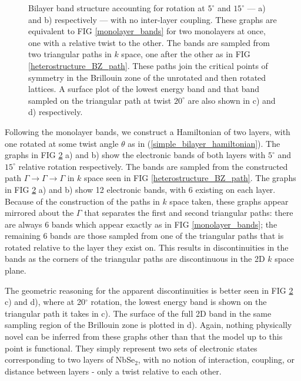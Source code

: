 \documentclass[12pt]{report} %
\begin{document}
\begin{figure}[t!]
\begin{subfigure}[t]{0.475\textwidth}
    \caption{
    }
    \label{surface_plot}
  \end{subfigure}
  \caption{
    Bilayer band structure accounting for rotation at $5^\circ$ and $15^\circ$ — a) and b) respectively — with no inter-layer coupling. These graphs are equivalent to FIG \ref{monolayer_bands} for two monolayers at once, one with a relative twist to the other. The bands are sampled from two triangular paths in $k$ space, one after the other as in FIG \ref{heterostructure_BZ_path}. These paths join the critical points of symmetry in the Brillouin zone of the unrotated and then rotated lattices. A surface plot of the lowest energy band and that band sampled on the triangular path at twist $20^\circ$ are also shown in c) and d) respectively.
  }
  \label{bilayer_bands}
\end{figure}

Following the monolayer bands, we construct a Hamiltonian of two layers, with one rotated at some twist angle $\theta$ as in (\ref{simple_bilayer_hamiltonian}). The graphs in FIG \ref{bilayer_bands} a) and b) show the electronic bands of both layers with $5^\circ$ and $15^\circ$ relative rotation respectively. The bands are sampled from the constructed path $\Gamma \rightarrow \Gamma \rightarrow \Gamma$ in $k$ space seen in FIG \ref{heterostructure_BZ_path}. The graphs in FIG \ref{bilayer_bands} a) and b) show 12 electronic bands, with 6 existing on each layer. Because of the construction of the paths in $k$ space taken, these graphs appear mirrored about the $\Gamma$ that separates the first and second triangular paths: there are always 6 bands which appear exactly as in FIG \ref{monolayer_bands}; the remaining 6 bands are those sampled from one of the triangular paths that is rotated relative to the layer they exist on. This results in discontinuities in the bands as the corners of the triangular paths are discontinuous in the 2D $k$ space plane.

The geometric reasoning for the apparent discontinuities is better seen in FIG \ref{bilayer_bands} c) and d), where at 20$^\circ$ rotation, the lowest energy band is shown on the triangular path it takes in c). The surface of the full 2D band in the same sampling region of the Brillouin zone is plotted in d). Again, nothing physically novel can be inferred from these graphs other than that the model up to this point is functional. They simply represent two sets of electronic states corresponding to two layers of NbSe$_2$, with no notion of interaction, coupling, or distance between layers - only a twist relative to each other. 
\end{document}
